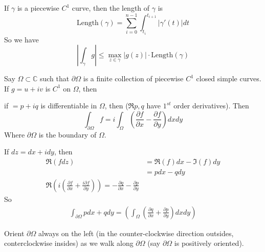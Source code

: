 \begin{theorem}
    If $\gamma$ is a piecewise $C^1$ curve, then the length of $\gamma$ is
    $$\text{Length}(\gamma) = \sum_{i = 0}^{n-1}\int_{t_i}^{t_{i + 1}} |\gamma'(t)| dt$$
    So we have
    $$ |\int_{\gamma}g |\leq \max_{z \in \gamma}|g(z)| \cdot \text{Length}(\gamma) $$
\end{theorem}

\begin{theorem}
    Say $ \Omega \subset \mathbb{C} $ such that $\partial \Omega$ is a finite collection of piecewise $C^1$ closed simple curves. If $g = u + iv$ is $C^1$ on $\Omega$, then

    if $ = p + iq$ is differentiable in $\Omega$, then ($\Re{p, q}$ have $1^{st}$ order derivatives). Then
    $$\int_{\partial \Omega} f = i \int_{\Omega} \left( \frac{\partial f}{\partial x} - \frac{\partial f}{\partial y} \right) dxdy$$
    Where $\partial \Omega$ is the boundary of $\Omega$.
\end{theorem}

\begin{corollary}
    If $dz = dx + idy$, then
    \begin{align*}
        \Re(fdz) & = \Re(f)dx - \Im(f)dy \\
                 & = pdx - qdy           \\
        \Re{(i \left(\frac{\partial f}{\partial x} + \frac{i \partial f}{\partial y}\right))} = - \frac{\partial q}{\partial x} - \frac{\partial p}{\partial y}
    \end{align*}
    So
    \begin{align*}
        \int_{\partial \Omega} pdx + qdy = \left(
        \int_{\Omega} \left( \frac{\partial q}{\partial x} + \frac{\partial p}{\partial y} \right) dxdy
        \right)
    \end{align*}
\end{corollary}

\begin{remark}
    Orient $\partial \Omega$ always on the left (in the counter-clockwise direction outsides, conterclockwise insides) as we walk along $\partial \Omega$ (say $\partial \Omega$ is positively oriented).
\end{remark}


